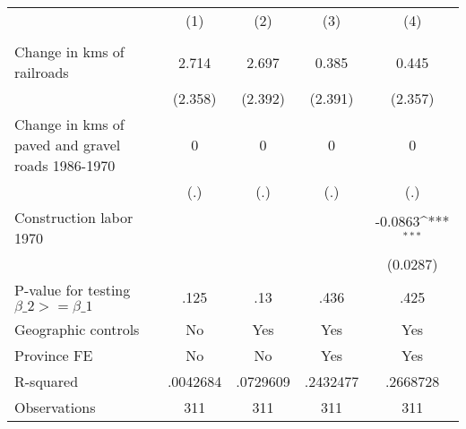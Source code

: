 {
\def\sym#1{\ifmmode^{#1}\else\(^{#1}\)\fi}
\begin{tabular}{l*{4}{c}}
\hline\hline
                &\multicolumn{1}{c}{(1)}&\multicolumn{1}{c}{(2)}&\multicolumn{1}{c}{(3)}&\multicolumn{1}{c}{(4)}\\
                &\multicolumn{1}{c}{}&\multicolumn{1}{c}{}&\multicolumn{1}{c}{}&\multicolumn{1}{c}{}\\
\hline
Change in kms of railroads&    2.714         &    2.697         &    0.385         &    0.445         \\
                &  (2.358)         &  (2.392)         &  (2.391)         &  (2.357)         \\
[1em]
Change in kms of paved and gravel roads 1986-1970&        0         &        0         &        0         &        0         \\
                &      (.)         &      (.)         &      (.)         &      (.)         \\
[1em]
Construction labor 1970&                  &                  &                  &  -0.0863\sym{***}\\
                &                  &                  &                  & (0.0287)         \\
\hline
P-value for testing $\beta\_{2} >= \beta\_{1}$&     .125         &      .13         &     .436         &     .425         \\
Geographic controls&       No         &      Yes         &      Yes         &      Yes         \\
Province FE     &       No         &       No         &      Yes         &      Yes         \\
R-squared       & .0042684         & .0729609         & .2432477         & .2668728         \\
Observations    &      311         &      311         &      311         &      311         \\
\hline\hline
\end{tabular}
}
